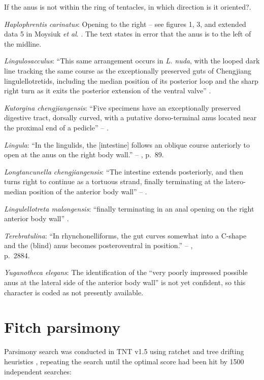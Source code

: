 \documentclass[]{book}
\theoremstyle{definition}
\theoremstyle{definition}
\theoremstyle{definition}
\theoremstyle{remark}
\begin{document}
If the anus is not within the ring of tentacles, in which direction is
it oriented?.

\emph{Haplophrentis carinatus}: Opening to the right -- see figures 1,
3, and extended data 5 in Moysiuk \emph{et al}.
\citeyearpar{Moysiuk2017Hyolithsare}. The text states in error that the
anus is to the left of the midline.

\emph{Lingulosacculus}: ``This same arrangement occurs in \emph{L.
nuda}, with the looped dark line tracking the same course as the
exceptionally preserved guts of Chengjiang lingulellotretids, including
the median position of its posterior loop and the sharp right turn as it
exits the posterior extension of the ventral valve''
\citep[p.310]{Balthasar2009EarlyCambrian}.

\emph{Kutorgina chengjiangensis}: ``Five specimens have an exceptionally
preserved digestive tract, dorsally curved, with a putative
dorso-terminal anus located near the proximal end of a pedicle'' --
\citet{Zhang2007Rhynchonelliformeanbrachiopods}.

\emph{Lingula}: ``In the lingulids, the {[}intestine{]} follows an
oblique course anteriorly to open at the anus on the right body wall.''
-- \citet{Williams1997BrachiopodaRevised}, p.~89.

\emph{Longtancunella chengjiangensis}: ``The intestine extends
posteriorly, and then turns right to continue as a tortuous strand,
finally terminating at the latero-median position of the anterior body
wall'' -- \citet{Zhang2007Agregarious}.

\emph{Lingulellotreta malongensis}: ``finally terminating in an anal
opening on the right anterior body wall'' \citep[p.66]{Zhang2007Noteon}.

\emph{Terebratulina}: ``In rhynchonelliforms, the gut curves somewhat
into a C-shape and the (blind) anus becomes posteroventral in
position.'' -- \citet{Williams2007PartH},\\
p.~2884.

\emph{Yuganotheca elegans}: The identification of the ``very poorly
impressed possible anus at the lateral side of the anterior body wall''
is not yet confident, so this character is coded as not presently
available.

\hypertarget{fitch}{%
\chapter{Fitch parsimony}\label{fitch}}

Parsimony search was conducted in TNT v1.5 \citep{Goloboff2016} using
ratchet and tree drifting heuristics \citep{Goloboff1999, Nixon1999},
repeating the search until the optimal score had been hit by 1500
independent searches:
\end{document}
